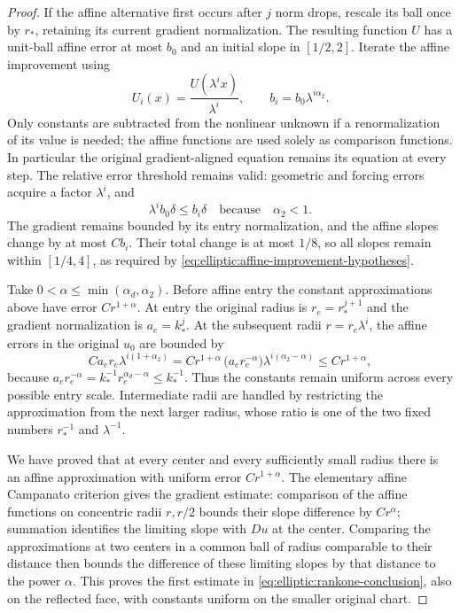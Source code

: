 \begin{proof}
If the affine alternative first occurs after $j$ norm drops, rescale its
ball once by $r_*$, retaining its current gradient normalization.
The resulting function $U$ has a unit-ball affine error at most $b_0$
and an initial slope in $[1/2,2]$.  Iterate the affine improvement using
\[
 U_i(x)=\frac{U(\lambda^i x)}{\lambda^i},
 \qquad b_i=b_0\lambda^{i\alpha_2}.
\]
Only constants are subtracted from the nonlinear unknown if a
renormalization of its value is needed; the affine functions are used
solely as comparison functions.  In particular the original
gradient-aligned equation remains its equation at every step.
The relative error threshold remains valid: geometric and forcing
errors acquire a factor $\lambda^i$, and
\[
 \lambda^i b_0\delta\leq b_i\delta
 \quad\text{because}\quad\alpha_2<1.
\]
The gradient remains bounded by its entry normalization, and the affine
slopes change by at most $Cb_i$.  Their total change is at most $1/8$,
so all slopes remain within $[1/4,4]$, as required by
\eqref{eq:elliptic:affine-improvement-hypotheses}.

Take $0<\alpha\leq\min(\alpha_d,\alpha_2)$.  Before affine entry the
constant approximations above have error $Cr^{1+\alpha}$.  At entry the
original radius is $r_e=r_*^{j+1}$ and the gradient normalization is
$a_e=k_*^j$.  At the subsequent radii $r=r_e\lambda^i$, the affine
errors in the original $u_0$ are bounded by
\[
 C a_e r_e\lambda^{i(1+\alpha_2)}
  =C r^{1+\alpha}\,
      \bigl(a_e r_e^{-\alpha}\bigr)
       \lambda^{i(\alpha_2-\alpha)}
  \leq C r^{1+\alpha},
\]
because
$a_e r_e^{-\alpha}=k_*^{-1}r_e^{\alpha_d-\alpha}\leq k_*^{-1}$.
Thus the constants remain uniform across every possible entry scale.
Intermediate radii are handled by restricting the approximation from
the next larger radius, whose ratio is one of the two fixed numbers
$r_*^{-1}$ and $\lambda^{-1}$.

We have proved that at every center and every sufficiently small radius
there is an affine approximation with uniform error $Cr^{1+\alpha}$.
The elementary affine Campanato criterion gives the gradient estimate:
comparison of the affine functions on concentric radii $r,r/2$ bounds
their slope difference by $Cr^\alpha$; summation identifies the limiting
slope with $Du$ at the center.  Comparing the approximations at two
centers in a common ball of radius comparable to their distance then
bounds the difference of these limiting slopes by that distance to the
power $\alpha$.  This proves the first estimate in
\eqref{eq:elliptic:rankone-conclusion}, also on the reflected
face, with constants uniform on the smaller original chart.


\end{proof}

